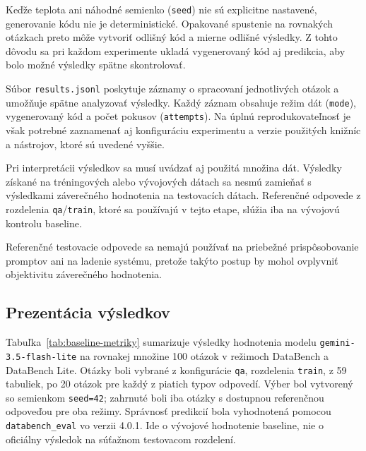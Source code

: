 Keďže teplota ani náhodné semienko (\texttt{seed}) nie sú explicitne nastavené, generovanie kódu nie je deterministické. Opakované spustenie na rovnakých otázkach preto môže vytvoriť odlišný kód a mierne odlišné výsledky. Z tohto dôvodu sa pri každom experimente ukladá vygenerovaný kód aj predikcia, aby bolo možné výsledky spätne skontrolovať.

Súbor \texttt{results.jsonl} poskytuje záznamy o spracovaní jednotlivých otázok a umožňuje spätne analyzovať výsledky. Každý záznam obsahuje režim dát (\texttt{mode}), vygenerovaný kód a počet pokusov (\texttt{attempts}). Na úplnú reprodukovateľnosť je však potrebné zaznamenať aj konfiguráciu experimentu a verzie použitých knižníc a nástrojov, ktoré sú uvedené vyššie.

Pri interpretácii výsledkov sa musí uvádzať aj použitá množina dát. Výsledky získané na tréningových alebo vývojových dátach sa nesmú zamieňať s výsledkami záverečného hodnotenia na testovacích dátach. Referenčné odpovede z rozdelenia \texttt{qa}/\texttt{train}, ktoré sa používajú v tejto etape, slúžia iba na vývojovú kontrolu baseline.

Referenčné testovacie odpovede sa nemajú používať na priebežné prispôsobovanie promptov ani na ladenie systému, pretože takýto postup by mohol ovplyvniť objektivitu záverečného hodnotenia.

\subsection{Prezentácia výsledkov}

Tabuľka~\ref{tab:baseline-metriky} sumarizuje výsledky hodnotenia modelu \texttt{gemini-3.5-flash-lite} na rovnakej množine 100 otázok v režimoch DataBench a DataBench Lite. Otázky boli vybrané z konfigurácie \texttt{qa}, rozdelenia \texttt{train}, z 59 tabuliek, po 20 otázok pre každý z piatich typov odpovedí. Výber bol vytvorený so semienkom \texttt{seed=42}; zahrnuté boli iba otázky s dostupnou referenčnou odpoveďou pre oba režimy. Správnosť predikcií bola vyhodnotená pomocou \texttt{databench\_eval} vo verzii 4.0.1. Ide o vývojové hodnotenie baseline, nie o oficiálny výsledok na súťažnom testovacom rozdelení.

